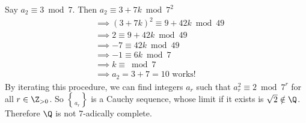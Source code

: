 Say $a_2\equiv3\bmod7$.  Then $a_2\equiv3+7k\bmod7^2$
\begin{align*}
&\implies (3+7k)^2 \equiv 9 + 42k \bmod 49 \\
&\implies 2\equiv 9+42k\bmod 49 \\
&\implies -7\equiv 42k \bmod 49 \\
&\implies -1\equiv 6k \bmod 7 \\
&\implies k\equiv \bmod 7 \\
&\implies a_2 = 3+7=10\text{ works!}
\end{align*}
%
By iterating this procedure, we can find integers $a_r$ such that $a_r^2\equiv2\bmod7^r$ for all $r\in\Z_{>0}$.  So $\brace{a_r}$ is a Cauchy sequence, whose limit if it exists is $\sqrt2\notin\Q$.  Therefore $\Q$ is not $7$-adically complete.
